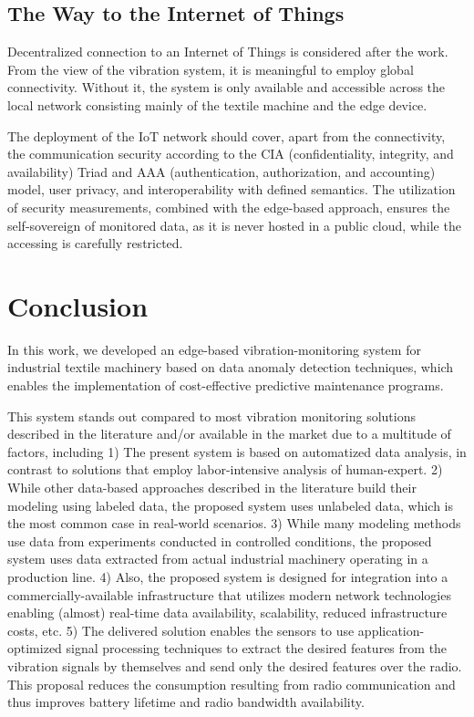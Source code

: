 \documentclass[conference]{IEEEtran}
\begin{document}
\subsection{The Way to the Internet of Things}
Decentralized connection to an Internet of Things is considered after the work. From the view of the vibration system, it is meaningful to employ global connectivity. Without it, the system is only available and accessible across the local network consisting mainly of the textile machine and the edge device.

The deployment of the IoT network should cover, apart from the connectivity, the communication security according to the CIA (confidentiality, integrity, and availability) Triad and AAA (authentication, authorization, and accounting) model, user privacy, and interoperability with defined semantics. The utilization of security measurements, combined with the edge-based approach, ensures the self-sovereign of monitored data, as it is never hosted in a public cloud, while the accessing is carefully restricted.


\section{Conclusion}
\label{sec_conclusion}

In this work, we developed an edge-based vibration-monitoring system for industrial textile machinery based on data anomaly detection techniques, which enables the implementation of cost-effective predictive maintenance programs.

This system stands out compared to most vibration monitoring solutions described in the literature and/or available in the market due to a multitude of factors, including 1) The present system is based on automatized data analysis, in contrast to solutions that employ labor-intensive analysis of human-expert. 2) While other data-based approaches described in the literature build their modeling using labeled data, the proposed system uses unlabeled data, which is the most common case in real-world scenarios. 3) While many modeling methods use data from experiments conducted in controlled conditions, the proposed system uses data extracted from actual industrial machinery operating in a production line. 4) Also, the proposed system is designed for integration into a commercially-available infrastructure that utilizes modern network technologies enabling (almost) real-time data availability, scalability, reduced infrastructure costs, etc. 5) The delivered solution enables the sensors to use application-optimized signal processing techniques to extract the desired features from the vibration signals by themselves and send only the desired features over the radio. This proposal reduces the consumption resulting from radio communication and thus improves battery lifetime and radio bandwidth availability.
\end{document}
